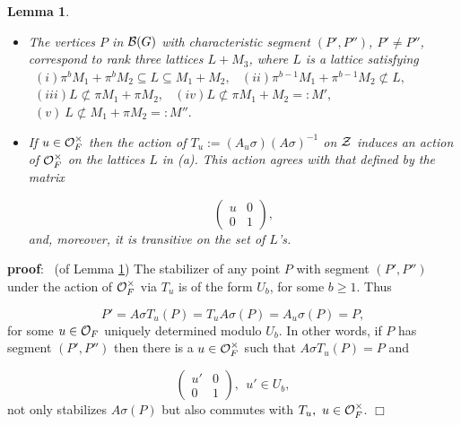 \documentclass[12pt,letterpaper]{article}
\newtheorem{lemma}[theorem]{Lemma}
\def\zz{{\cal Z}}
\def\pf{{\bf proof}:\ }
\def\qed{$\Box$}
\def\off{{\cal O}_F}
\def\bbg{{\cal B}(G)}
\begin{document}
\begin{lemma}
\label{lemma:4.18}

\begin{itemize}
\item[(a)] 
The vertices $P$ in $\bbg$ with characteristic segment $(P',P'')$,
$P' \not= P''$, correspond to rank three lattices
$L+M_3$, where $L$ is a lattice satisfying
\newline
$\ \ (i) \pi^bM_1 +\pi^bM_2 \subseteq L \subseteq M_1+M_2,$
\newline
$\ \ (ii) \pi^{b-1}M_1 + \pi^{b-1}M_2 \not\subset L,$
\newline
$\ \ (iii) L \not\subset \pi M_1+\pi M_2,$
\newline
$\ \ (iv)  L \not\subset \pi M_1+ M_2 =:M',$
\newline
$\ \ (v) \  L \not\subset  M_1+\pi M_2=:M''.$
\newline

\item[(b)] 
If $u\in \off^{\times}$ then the action of 
$T_u := (A_u\sigma )(A\sigma )^{-1}$ on $\zz$ induces an action of 
$\off^{\times}$ on the lattices $L$ in (a). This action agrees with
that defined by the matrix

\[
\left(
\begin{array}{cc}
u&0\\0&1 
\end{array}
\right),
\]
and, moreover, it is transitive on the set of $L$'s.
\end{itemize}
\end{lemma}

\pf
(of Lemma \ref{lemma:4.18})
The stabilizer of any point $P$ with segment $(P',P'')$ under the action of 
$\off^{\times}$ via $T_u$ is of the form $U_b$, for some $b\geq 1$. Thus

\begin{equation}
\label{eqn:4.19}
P'=A\sigma T_u(P)=T_uA\sigma (P)=A_u\sigma (P)=P,
\end{equation}
for some $u\in\off$ uniquely determined modulo $U_b$. In other words, if $P$ 
has segment $(P',P'')$ then there is a $u\in \off^{\times}$ such that
$A\sigma T_u (P)=P$ and

\[
\left(
\begin{array}{cc}
u'&0\\0&1 \end{array}
\right),\ \ u'\in U_b,
\]
not only stabilizes $A\sigma (P)$ but also commutes with $T_u, \ u\in
\off^{\times}$. 
\qed
\end{document}
